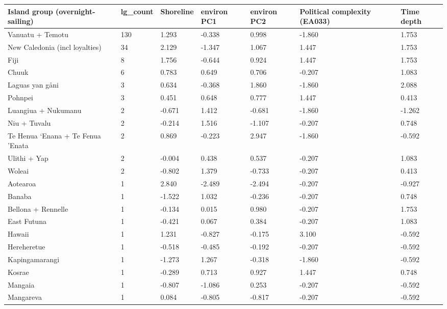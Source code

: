 \begin{longtable}{p{4.5cm}p{1.4cm}p{1.4cm}p{1.7cm}p{1.7cm}p{1.7cm}p{1.7cm}}
  \toprule
Island group (overnight-sailing) & lg_count & Shoreline & environ PC1 & environ PC2 & Political complexity (EA033) & Time depth \\ 
  \midrule
Vanuatu + Temotu & 130 & 1.293 & -0.338 & 0.998 & -1.860 & 1.753 \\ 
  New Caledonia (incl loyalties) & 34 & 2.129 & -1.347 & 1.067 & 1.447 & 1.753 \\ 
  Fiji & 8 & 1.756 & -0.644 & 0.924 & 1.447 & 1.753 \\ 
  Chuuk & 6 & 0.783 & 0.649 & 0.706 & -0.207 & 1.083 \\ 
  Laguas yan gåni & 3 & 0.634 & -0.368 & 1.860 & -1.860 & 2.088 \\ 
  Pohnpei & 3 & 0.451 & 0.648 & 0.777 & 1.447 & 0.413 \\ 
  Luangiua + Nukumanu & 2 & -0.671 & 1.412 & -0.681 & -1.860 & -1.262 \\ 
  Niu + Tuvalu & 2 & -0.214 & 1.516 & -1.107 & -0.207 & 0.748 \\ 
  Te Henua ‘Enana + Te Fenua ’Enata & 2 & 0.869 & -0.223 & 2.947 & -1.860 & -0.592 \\ 
  Ulithi + Yap & 2 & -0.004 & 0.438 & 0.537 & -0.207 & 1.083 \\ 
  Woleai & 2 & -0.802 & 1.379 & -0.733 & -0.207 & 0.413 \\ 
  Aotearoa & 1 & 2.840 & -2.489 & -2.494 & -0.207 & -0.927 \\ 
  Banaba & 1 & -1.522 & 1.032 & -0.236 & -0.207 & 0.748 \\ 
  Bellona + Rennelle & 1 & -0.134 & 0.015 & 0.980 & -0.207 & 1.753 \\ 
  East Futuna & 1 & -0.421 & 0.067 & 0.384 & -0.207 & 1.083 \\ 
  Hawaii & 1 & 1.231 & -0.827 & -0.175 & 3.100 & -0.592 \\ 
  Hereheretue & 1 & -0.518 & -0.485 & -0.192 & -0.207 & -0.592 \\ 
  Kapingamarangi & 1 & -1.273 & 1.267 & -0.318 & -1.860 & -0.592 \\ 
  Kosrae & 1 & -0.289 & 0.713 & 0.927 & 1.447 & 0.748 \\ 
  Mangaia & 1 & -0.807 & -1.086 & 0.253 & -0.207 & -0.592 \\ 
  Mangareva & 1 & 0.084 & -0.805 & -0.817 & -0.207 & -0.592 \\ 

\end{longtable}
